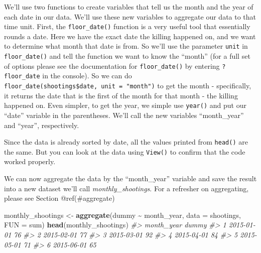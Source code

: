 \documentclass[
  12pt,
]{book}
\newenvironment{Shaded}{\begin{snugshade}}{\end{snugshade}}
\newcommand{\CommentTok}[1]{\textcolor[rgb]{0.37,0.37,0.37}{\textit{#1}}}
\newcommand{\DataTypeTok}[1]{\textcolor[rgb]{0.27,0.27,0.27}{#1}}
\newcommand{\KeywordTok}[1]{\textcolor[rgb]{0.27,0.27,0.27}{\textbf{#1}}}
\newcommand{\NormalTok}[1]{#1}
\newcommand{\OperatorTok}[1]{\textcolor[rgb]{0.43,0.43,0.43}{\textbf{#1}}}
\newcommand{\StringTok}[1]{\textcolor[rgb]{0.5,0.5,0.5}{#1}}
\begin{document}
We'll use two functions to create variables that tell us the month and the year of each date in our data. We'll use these new variables to aggregate our data to that time unit. First, the \texttt{floor\_date()} function is a very useful tool that essentially rounds a date. Here we have the exact date the killing happened on, and we want to determine what month that date is from. So we'll use the parameter \texttt{unit} in \texttt{floor\_date()} and tell the function we want to know the ``month'' (for a full set of options please see the documentation for \texttt{floor\_date()} by entering \texttt{?floor\_date} in the console). So we can do \texttt{floor\_date(shootings\$date,\ unit\ =\ "month")} to get the month - specifically, it returns the date that is the first of the month for that month - the killing happened on. Even simpler, to get the year, we simple use \texttt{year()} and put our ``date'' variable in the parentheses. We'll call the new variables ``month\_year'' and ``year'', respectively.

\begin{Shaded}
\end{Shaded}

Since the data is already sorted by date, all the values printed from \texttt{head()} are the same. But you can look at the data using \texttt{View()} to confirm that the code worked properly.

We can now aggregate the data by the ``month\_year'' variable and save the result into a new dataset we'll call \emph{monthly\_shootings}. For a refresher on aggregating, please see Section @ref(\#aggregate)

\begin{Shaded}
\begin{Highlighting}[]
\NormalTok{monthly\_shootings <{-}}\StringTok{ }\KeywordTok{aggregate}\NormalTok{(dummy }\OperatorTok{\textasciitilde{}}\StringTok{ }\NormalTok{month\_year, }\DataTypeTok{data =}\NormalTok{ shootings, }\DataTypeTok{FUN =}\NormalTok{ sum)}
\KeywordTok{head}\NormalTok{(monthly\_shootings)}
\CommentTok{\#>   month\_year dummy}
\CommentTok{\#> 1 2015{-}01{-}01    76}
\CommentTok{\#> 2 2015{-}02{-}01    77}
\CommentTok{\#> 3 2015{-}03{-}01    92}
\CommentTok{\#> 4 2015{-}04{-}01    84}
\CommentTok{\#> 5 2015{-}05{-}01    71}
\CommentTok{\#> 6 2015{-}06{-}01    65}
\end{Highlighting}
\end{Shaded}
\end{document}
